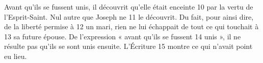 Avant qu'ils se fussent unis, il découvrit qu'elle était enceinte	 
10	 	par la vertu de l'Esprit-Saint. Nul autre que Joseph ne	 
11	 	le découvrit. Du fait, pour ainsi dire, de la liberté permise à	 
12	 	un mari, rien ne lui échappait de tout ce qui touchait à	 
13	 	sa future épouse. De l'expression « avant qu'ils se fussent	 
14	 	unis », il ne résulte pas qu'ils se sont unis ensuite. L'Écriture	 
15	 	montre ce qui n'avait point eu lieu.